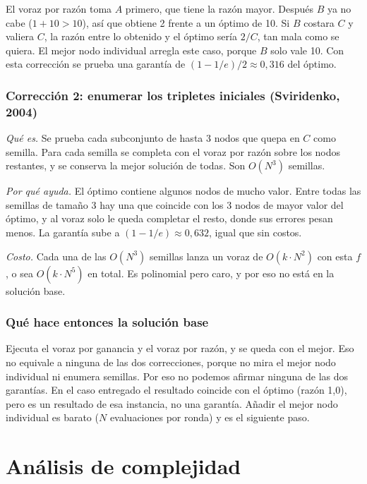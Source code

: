 \documentclass[11pt,a4paper]{article}
\begin{document}
El voraz por razón toma $A$ primero, que tiene la razón mayor. Después $B$ ya
no cabe ($1+10>10$), así que obtiene 2 frente a un óptimo de 10. Si $B$ costara
$C$ y valiera $C$, la razón entre lo obtenido y el óptimo sería $2/C$, tan mala
como se quiera. El mejor nodo individual arregla este caso, porque $B$ solo
vale 10. Con esta corrección se prueba una garantía de
$(1-1/e)/2\approx0{,}316$ del óptimo.

\subsubsection{Corrección 2: enumerar los tripletes iniciales (Sviridenko, 2004)}

\emph{Qué es.} Se prueba cada subconjunto de hasta 3 nodos que quepa en $C$
como semilla. Para cada semilla se completa con el voraz por razón sobre los
nodos restantes, y se conserva la mejor solución de todas. Son $O(N^3)$
semillas.

\emph{Por qué ayuda.} El óptimo contiene algunos nodos de mucho valor. Entre
todas las semillas de tamaño 3 hay una que coincide con los 3 nodos de mayor
valor del óptimo, y al voraz solo le queda completar el resto, donde sus errores
pesan menos. La garantía sube a $(1-1/e)\approx0{,}632$, igual que sin costos.

\emph{Costo.} Cada una de las $O(N^3)$ semillas lanza un voraz de
$O(k\cdot N^2)$ con esta $f$, o sea $O(k\cdot N^5)$ en total. Es polinomial
pero caro, y por eso no está en la solución base.

\subsubsection{Qué hace entonces la solución base}

Ejecuta el voraz por ganancia y el voraz por razón, y se queda con el mejor.
Eso no equivale a ninguna de las dos correcciones, porque no mira el mejor nodo
individual ni enumera semillas. Por eso no podemos afirmar ninguna de las dos
garantías. En el caso entregado el resultado coincide con el óptimo
(razón 1,0), pero es un resultado de esa instancia, no una garantía. Añadir el
mejor nodo individual es barato ($N$ evaluaciones por ronda) y es el siguiente
paso.

\section{Análisis de complejidad}
\end{document}
